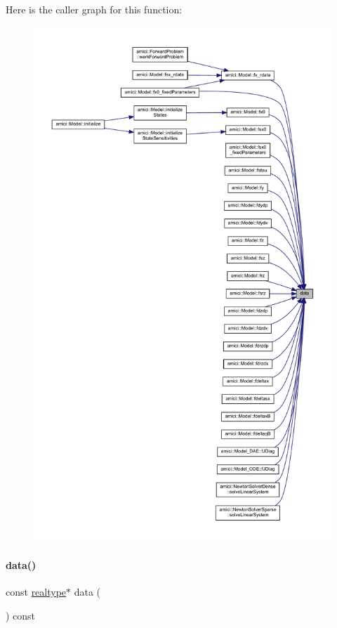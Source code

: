 Here is the caller graph for this function\+:
\nopagebreak
\begin{figure}[H]
\begin{center}
\leavevmode
\includegraphics[height=550pt]{classamici_1_1_ami_vector_aee17a5447b8e03180f89a2a8acbd572f_icgraph}
\end{center}
\end{figure}
\mbox{\label{classamici_1_1_ami_vector_a8045bd641b2f456cdbf99d0c12bb9218}} 
\paragraph{\texorpdfstring{data()}{data()}\hspace{0.1cm}{\footnotesize\ttfamily [2/2]}}
{\footnotesize\ttfamily const \mbox{\hyperlink{namespaceamici_a1bdce28051d6a53868f7ccbf5f2c14a3}{realtype}}$\ast$ data (\begin{DoxyParamCaption}{ }\end{DoxyParamCaption}) const}

